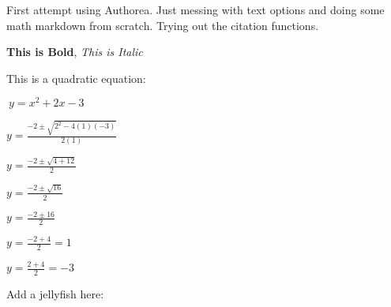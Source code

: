First attempt using Authorea. Just messing with text options and doing some math markdown from scratch. Trying out the citation functions.

\textbf{This is Bold}, \textit{This is Italic}

This is a quadratic equation:

$\ y = x^{2} + 2x -3 $


$ y = \frac{-2 \pm \sqrt{2^{2}-4(1)(-3)}}{2(1)}$

$ y = \frac{-2 \pm \sqrt{4+12}}{2}$

$ y = \frac{-2 \pm \sqrt{16}}{2}$

$ y = \frac{-2 \pm {16}}{2}$

$ y = \frac{-2 + {4}}{2} = 1$

$ y = \frac{2 + {4}}{2} = -3$


Add a jellyfish here:

